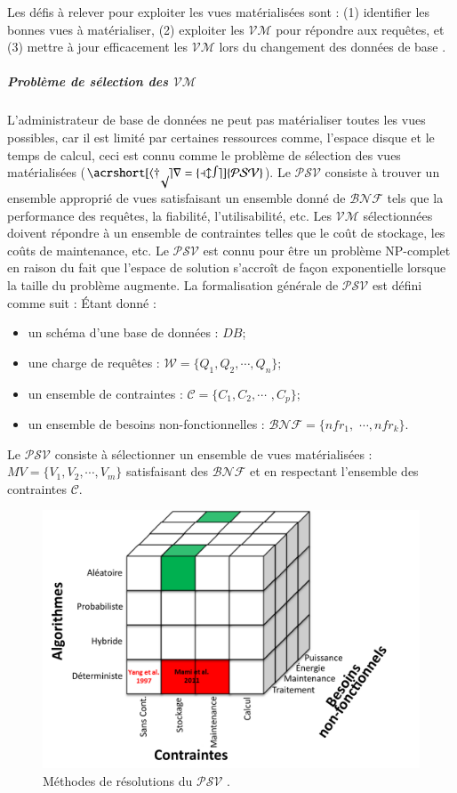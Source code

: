 Les défis à relever pour exploiter les vues matérialisées sont : (1) identifier les bonnes vues à matérialiser, (2) exploiter les $\mathcal{VM}$ pour répondre aux requêtes, et (3) mettre à jour efficacement les $\mathcal{VM}$ lors du changement des données de base \cite{Chaudhuri97b}.

\subparagraph{Problème de sélection des $\mathcal{VM}$}

L'administrateur de base de données ne peut pas matérialiser toutes les vues possibles, car il est limité par certaines ressources comme, l'espace disque et le temps de calcul, ceci est connu comme le problème de sélection des vues matérialisées ($\mathcal{\acrshort[hyper=false]{PSV}}$).
Le $\mathcal{PSV}$ consiste à trouver un ensemble approprié de vues satisfaisant un ensemble donné de $\mathcal{BNF}$ tels que la performance des requêtes, la fiabilité, l'utilisabilité, etc. Les $\mathcal{VM}$ sélectionnées doivent répondre à un ensemble de contraintes telles que le coût de stockage, les coûts de maintenance, etc. Le $\mathcal{PSV}$ est connu pour être un problème NP-complet \cite{Gupta99} en raison du fait que l'espace de solution s'accroît de façon exponentielle lorsque la taille du problème augmente. La formalisation générale de $\mathcal{PSV}$ est défini comme suit : Étant donné :

\begin{itemize}
\item un schéma d'une base de données : $DB$; 
\item une charge de requêtes : $\mathcal{W} = \{Q_1, Q_2, \cdots , Q_n\}$; 
\item un ensemble de contraintes : $\mathcal{C} = \{C_1, C_2, \cdots$ $ , C_p\}$; 
\item un ensemble de besoins non-fonctionnelles : $\mathcal{BNF} = \{nfr_1,$ $\cdots, nfr_k\}$. 
\end{itemize}

Le $\mathcal{PSV}$ consiste à sélectionner un ensemble de vues matérialisées : $MV = \{V_1, V_2, \cdots , V_m\}$ satisfaisant des $\mathcal{BNF}$ et en respectant l'ensemble des contraintes $\mathcal{C}$.

\begin{figure}
	\centering
	\includegraphics[scale=0.4]{chapitre2/chap2Fig/cubeNFR.pdf}
	\caption{Méthodes de résolutions du $\mathcal{PSV}$ .}
	\label{fig:warehouse-solutions}
\end{figure}

